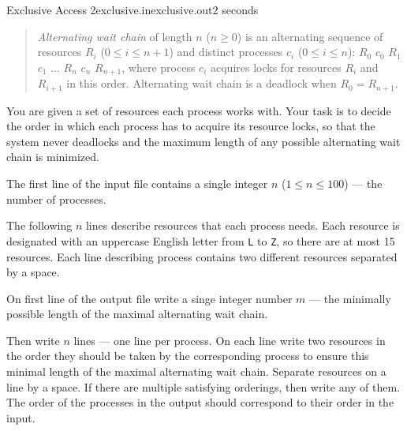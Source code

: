 \begin{problem}{Exclusive Access 2}{exclusive.in}{exclusive.out}{2 seconds}
\begin{quote}
   \emph{Alternating wait chain} of length $n$ ($n \ge 0$) is an alternating sequence of resources $R_i$ ($0 \le i \le n+1$) and
   distinct processes $c_i$ ($0 \le i \le n$): $R_0$ $c_0$ $R_1$ $c_1$ $...$ $R_n$ $c_n$ $R_{n+1}$, where
   process $c_i$ acquires locks for resources $R_i$ and $R_{i+1}$ in this order.
   Alternating wait chain is a deadlock when $R_0 = R_{n+1}$. 
\end{quote}

You are given a set of resources each process works with. Your task is to decide the order in which each process
has to acquire its resource locks, so that the system never deadlocks and the maximum length of any possible
alternating wait chain is minimized.

\InputFile

The first line of the input file contains a single integer $n$ ($1 \le n \le 100$) --- the number of processes.

The following $n$ lines describe resources that each process needs. Each resource is designated with an
uppercase English letter from \texttt{L} to \texttt{Z}, so there are at most 15 resources. 
Each line describing process contains two different resources separated by a space.

\OutputFile

On first line of the output file write a singe integer number $m$ --- the minimally possible length of the 
maximal alternating wait chain.

Then write $n$ lines --- one line per process. On each line write two resources in the
order they should be taken by the corresponding process to ensure this minimal length of the maximal 
alternating wait chain. Separate resources on a line by a space. If there are multiple satisfying 
orderings, then write any of them. The order of the processes in the output should correspond 
to their order in the input.

\Example

\begin{example}
%
%
%
%
%
\end{example}

\end{problem}
